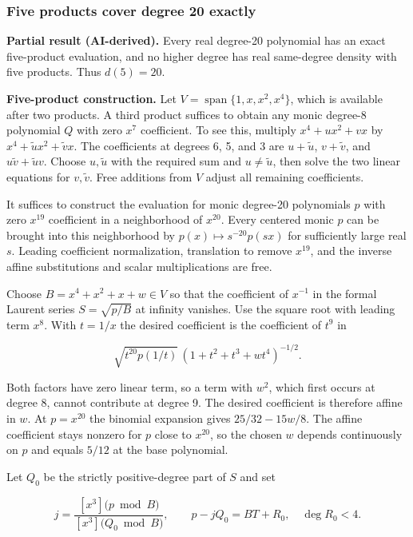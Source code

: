 \documentclass[11pt,a4paper]{article}
\begin{document}
\subsubsection{Five products cover degree 20
exactly}\label{five-products-cover-degree-20-exactly}

\textbf{Partial result (AI-derived).} Every real degree-20 polynomial
has an exact five-product evaluation, and no higher degree has real
same-degree density with five products. Thus \(d(5)=20\).

\textbf{Five-product construction.} Let
\(V=\mathop{\mathrm{span}}\nolimits\{1,x,x^2,x^4\}\), which is available
after two products. A third product suffices to obtain any monic
degree-8 polynomial \(Q\) with zero \(x^7\) coefficient. To see this,
multiply \(x^4+u x^2+v x\) by \(x^4+\tilde u x^2+\tilde v x\). The
coefficients at degrees 6, 5, and 3 are \(u+\tilde u\), \(v+\tilde v\),
and \(u\tilde v+\tilde u v\). Choose \(u,\tilde u\) with the required
sum and \(u\ne\tilde u\), then solve the two linear equations for
\(v,\tilde v\). Free additions from \(V\) adjust all remaining
coefficients.

It suffices to construct the evaluation for monic degree-20 polynomials
\(p\) with zero \(x^{19}\) coefficient in a neighborhood of \(x^{20}\).
Every centered monic \(p\) can be brought into this neighborhood by
\(p(x)\mapsto s^{-20}p(sx)\) for sufficiently large real \(s\). Leading
coefficient normalization, translation to remove \(x^{19}\), and the
inverse affine substitutions and scalar multiplications are free.

Choose \(B=x^4+x^2+x+w\in V\) so that the coefficient of \(x^{-1}\) in
the formal Laurent series \(S=\sqrt{p/B}\) at infinity vanishes. Use the
square root with leading term \(x^8\). With \(t=1/x\) the desired
coefficient is the coefficient of \(t^9\) in

\[\sqrt{t^{20}p(1/t)}\,(1+t^2+t^3+w t^4)^{-1/2}.\]

Both factors have zero linear term, so a term with \(w^2\), which first
occurs at degree 8, cannot contribute at degree 9. The desired
coefficient is therefore affine in \(w\). At \(p=x^{20}\) the binomial
expansion gives \(25/32-15w/8\). The affine coefficient stays nonzero
for \(p\) close to \(x^{20}\), so the chosen \(w\) depends continuously
on \(p\) and equals \(5/12\) at the base polynomial.

Let \(Q_0\) be the strictly positive-degree part of \(S\) and set

\[j=\frac{[x^3]\bigl(p\bmod B\bigr)}{[x^3]\bigl(Q_0\bmod B\bigr)},\qquad
p-jQ_0=BT+R_0,\quad \deg R_0<4.\]
\end{document}

